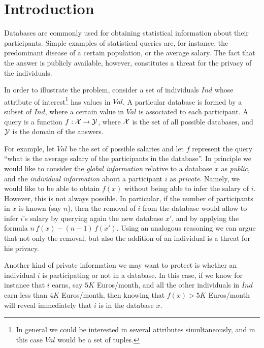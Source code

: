 \documentclass{llncs}
\begin{document}
\section{Introduction}\label{section:introduction}
Databases are commonly used for obtaining statistical information about their participants. Simple examples of statistical queries are, for instance, the predominant disease of a certain population,  or the average salary. 
The fact that the answer is publicly available, however, constitutes a threat  for the privacy of the individuals. 

In order to illustrate the problem, consider a set of individuals  $\mathit{Ind}$ whose attribute of interest\footnote{In general we could be interested in several attributes simultaneously, and in this case $\mathit{Val}$ would be a set of tuples.} has values in $\mathit{Val}$. 
A particular database is formed by a subset of $\mathit{Ind}$, where a certain value in $\mathit{Val}$ is associated to each participant. 
A query  is a function $f: {\cal X} \rightarrow {\cal Y}$, where  $\cal X$ is the set of all possible databases, and 
${\cal Y}$ is the domain of the answers. 

For example, let $\mathit{Val}$   be the set of possible salaries and let $f$ represent the query ``what is  the average salary of the participants in the database''. 
In principle we would like to consider the \emph{global information} relative to a database $x$ as \emph{public}, and the \emph{individual information} about a participant $i$ as \emph{private}.  Namely, we would like to be able to obtain $f(x)$ without being able to infer the salary of $i$.  However, this is not always possible. In particular, if the number of participants in $x$ is known (say  $n$), then the removal of $i$  from the database would allow to infer $i$'s salary by querying again the  new database $x'$, and by applying the formula $n\, f(x) -  (n-1)\, f(x')$. Using an analogous reasoning we can argue that not only the removal, but also the addition of an individual is a threat for his privacy. 

Another kind of private information we may want to protect is whether an individual $i$ is participating or not in a database. In this case, if we know for instance that $i$ earns, say  $5K$ Euros/month, and all the other individuals in $\mathit{Ind}$ earn less than $4K$ Euros/month, then knowing that $f(x) > 5K$ Euros/month will reveal immediately that $i$ is in the database $x$. 
\end{document}
